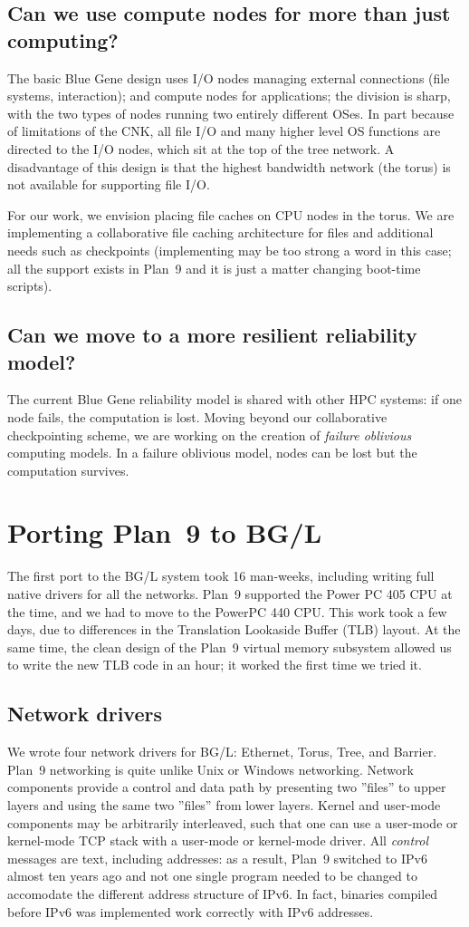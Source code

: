 \documentclass[letterpaper,twocolumn,10pt]{article}
\begin{document}
\subsection{Can we use compute nodes for more than just computing?}
The basic Blue Gene design uses I/O nodes managing external connections (file systems, interaction); and compute nodes for applications; the division is sharp, with the two types of nodes running two entirely different OSes. In part because of limitations of the CNK, all file I/O and many higher level OS functions are directed to the I/O nodes, which sit at the top of the tree network. A disadvantage of this design is that the highest bandwidth network (the torus) is not available for supporting file I/O. 

For our work, we envision placing file caches on CPU nodes in the torus. We are implementing a collaborative file caching architecture for files and additional needs such as checkpoints (implementing may be too strong a word in this case; all the support exists in Plan~9 and it is just a matter changing boot-time scripts). 
\subsection{Can we move to a more resilient reliability model?}
The current Blue Gene reliability model is shared with other HPC systems: if one node fails, the computation is lost. Moving beyond our collaborative checkpointing scheme, we are working on the creation of \textit{failure oblivious} computing models. In a failure oblivious model, nodes can be lost but the computation survives. 
\section{Porting Plan~9 to BG/L}
The first port to the BG/L system took 16 man-weeks, including writing full native drivers for all the networks. Plan~9 supported the Power PC 405 CPU at the time, and we had to move to the PowerPC 440 CPU. This work took a few days, due to differences in the Translation Lookaside Buffer (TLB) layout. At the same time, the clean design of the Plan~9 virtual memory subsystem allowed us to write the new TLB code in an hour; it worked the first time we tried it. 
\subsection{Network drivers}
We wrote four network drivers for BG/L: Ethernet, Torus, Tree, and Barrier. Plan~9 networking\cite{presotto93organization} is quite unlike Unix or Windows networking. Network components provide a control and data path by presenting two ''files'' to upper layers and using the same two ''files'' from lower layers. Kernel and user-mode components may be arbitrarily interleaved, such that one can use a user-mode or kernel-mode TCP stack with a user-mode or kernel-mode driver. All \textit{control} messages are text, including addresses: as a result, Plan~9 switched to IPv6 almost ten years ago and not one single program needed to be changed to accomodate the different address structure of IPv6. In fact, binaries compiled before IPv6 was implemented work correctly with IPv6 addresses.
\end{document}
